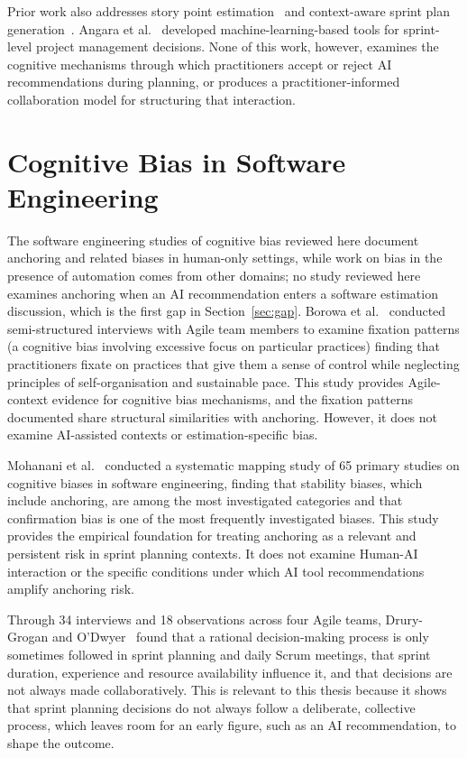 \documentclass[a4paper,twoside]{bth}
\begin{document}
Prior work also addresses story point estimation~\cite{choetkiertikul2018deep} and context-aware sprint plan generation~\cite{kula2024context}. Angara et al.~\cite{angara2020devops} developed machine-learning-based tools for sprint-level project management decisions. None of this work, however, examines the cognitive mechanisms through which practitioners accept or reject AI recommendations during planning, or produces a practitioner-informed collaboration model for structuring that interaction.

\section{Cognitive Bias in Software Engineering}

The software engineering studies of cognitive bias reviewed here document anchoring and related biases in human-only settings, while work on bias in the presence of automation comes from other domains; no study reviewed here examines anchoring when an AI recommendation enters a software estimation discussion, which is the first gap in Section~\ref{sec:gap}. Borowa et al.~\cite{borowa2023fixations} conducted semi-structured interviews with Agile team members to examine fixation patterns (a cognitive bias involving excessive focus on particular practices) finding that practitioners fixate on practices that give them a sense of control while neglecting principles of self-organisation and sustainable pace. This study provides Agile-context evidence for cognitive bias mechanisms, and the fixation patterns documented share structural similarities with anchoring. However, it does not examine AI-assisted contexts or estimation-specific bias.

Mohanani et al.~\cite{mohanani2018cognitive} conducted a systematic mapping study of 65 primary studies on cognitive biases in software engineering, finding that stability biases, which include anchoring, are among the most investigated categories and that confirmation bias is one of the most frequently investigated biases. This study provides the empirical foundation for treating anchoring as a relevant and persistent risk in sprint planning contexts. It does not examine Human-AI interaction or the specific conditions under which AI tool recommendations amplify anchoring risk.

Through 34 interviews and 18 observations across four Agile teams, Drury-Grogan and O'Dwyer~\cite{drury2013investigation} found that a rational decision-making process is only sometimes followed in sprint planning and daily Scrum meetings, that sprint duration, experience and resource availability influence it, and that decisions are not always made collaboratively. This is relevant to this thesis because it shows that sprint planning decisions do not always follow a deliberate, collective process, which leaves room for an early figure, such as an AI recommendation, to shape the outcome.
\end{document}
